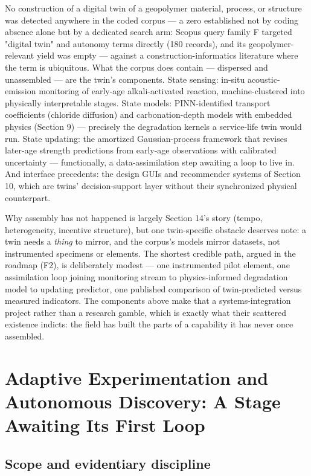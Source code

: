 \documentclass[pdflatex,sn-basic]{sn-jnl}
\begin{document}
No construction of a digital twin of a geopolymer material, process, or structure was detected anywhere in the coded corpus --- a zero established not by coding absence alone but by a dedicated search arm: Scopus query family F targeted "digital twin" and autonomy terms directly (180 records), and its geopolymer-relevant yield was empty --- against a construction-informatics literature where the term is ubiquitous. What the corpus does contain --- dispersed and unassembled --- are the twin's components. State sensing: in-situ acoustic-emission monitoring of early-age alkali-activated reaction, machine-clustered into physically interpretable stages. State models: PINN-identified transport coefficients (chloride diffusion) and carbonation-depth models with embedded physics (Section 9) --- precisely the degradation kernels a service-life twin would run. State updating: the amortized Gaussian-process framework that revises later-age strength predictions from early-age observations with calibrated uncertainty \citep{chan2026} --- functionally, a data-assimilation step awaiting a loop to live in. And interface precedents: the design GUIs and recommender systems of Section 10, which are twins' decision-support layer without their synchronized physical counterpart.

Why assembly has not happened is largely Section 14's story (tempo, heterogeneity, incentive structure), but one twin-specific obstacle deserves note: a twin needs a \emph{thing} to mirror, and the corpus's models mirror datasets, not instrumented specimens or elements. The shortest credible path, argued in the roadmap (F2), is deliberately modest --- one instrumented pilot element, one assimilation loop joining monitoring stream to physics-informed degradation model to updating predictor, one published comparison of twin-predicted versus measured indicators. The components above make that a systems-integration project rather than a research gamble, which is exactly what their scattered existence indicts: the field has built the parts of a capability it has never once assembled.

\section{Adaptive Experimentation and Autonomous Discovery: A Stage Awaiting Its First Loop}

\subsection{Scope and evidentiary discipline}
\end{document}
